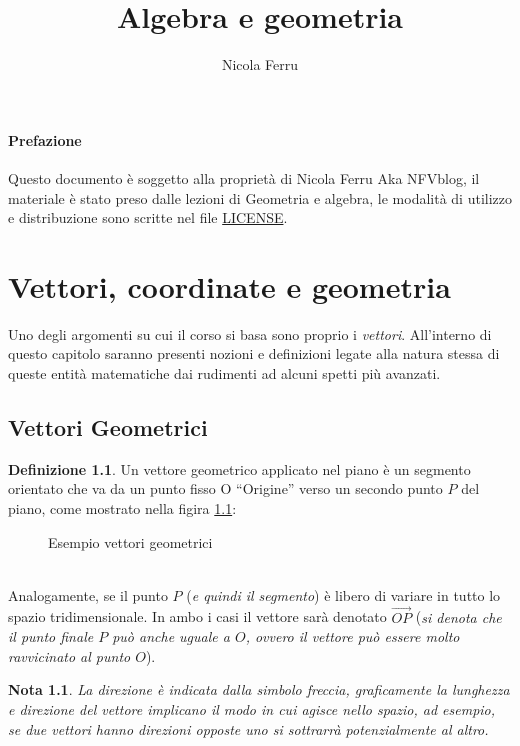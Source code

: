 \documentclass{book}
\title{Algebra e geometria}
\author{Nicola Ferru}
\theoremstyle{definition}
\newtheorem{defi}{Definizione}[section]
\theoremstyle{plain}
\newtheorem{nota}{Nota}[section]
\begin{document}
\maketitle
\tableofcontents

\subsubsection{Prefazione}
\label{sec:pref}

Questo documento è soggetto alla proprietà di Nicola Ferru Aka NFVblog, il materiale è stato preso dalle lezioni di Geometria e algebra, le modalità di utilizzo e distribuzione sono scritte nel file \href{https://github.com/NF02/Appunti-universita/blob/main/LICENSE}{LICENSE}.

\chapter{Vettori, coordinate e geometria}
\label{chap:vettcoordegeo}
Uno degli argomenti su cui il corso si basa sono proprio i \textit{vettori}. All'interno di questo capitolo saranno presenti nozioni e definizioni legate alla natura stessa di queste entità matematiche dai rudimenti ad alcuni spetti più avanzati.

\section{Vettori Geometrici}
\label{sec:vettorigeo}
\begin{defi}
  \label{def:vettorigeo}
  Un vettore geometrico applicato nel piano è un segmento orientato che va da un punto fisso O ``Origine'' verso un secondo punto $P$ del piano, come mostrato nella figira \ref{fig:vettorigeo}: 
  \begin{figure}[ht!]
    \centering
    \resizebox{3cm}{!}{
      
    }
    \caption{Esempio vettori geometrici}
    \label{fig:vettorigeo}
  \end{figure}\\
  Analogamente, se il punto $P$ (\textit{e quindi il segmento}) è libero di variare in tutto lo spazio tridimensionale. In ambo i casi il vettore sarà denotato $\vec{OP}$ (\textit{si denota che il punto finale $P$ può anche uguale a $O$, ovvero il vettore può essere molto ravvicinato al punto $O$}).
\end{defi}
\begin{nota}
  \label{nota:vettorigeo}
  La direzione è indicata dalla simbolo freccia, graficamente la lunghezza e direzione del vettore implicano il modo in cui agisce nello spazio, ad esempio, se due vettori hanno direzioni opposte uno si sottrarrà potenzialmente al altro.
\end{nota}
\end{document}
